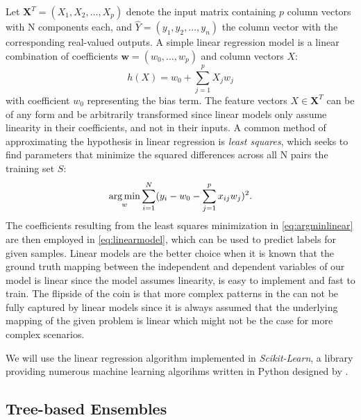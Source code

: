 Let $ \textbf{X}^{T} = (X_1, X_2, \dots, X_p) $ denote the input matrix containing $ p $ column vectors with N components each, and $ \hat{Y} = (y_1, y_2, \dots, y_n)$ the column vector with the corresponding real-valued outputs. A simple linear regression model is a linear combination of coefficients $ \mathbf{w} = (w_0, \dots, w_p) $ and column vectors $ X $:
\begin{equation}\label{eq:linearmodel}
h(X) = w_0 + \sum_{j=1}^{p} X_jw_j
\end{equation}
with coefficient $ w_0 $ representing the bias term. The feature vectors $ X \in \textbf{X}^{T} $ can be of any form and be arbitrarily transformed since linear models only assume linearity in their coefficients, and not in their inputs.
A common method of approximating the hypothesis in linear regression is \textit{least squares}, which seeks to find parameters that minimize the squared differences across all N pairs the training set $ S $:
\begin{equation}\label{eq:argminlinear}
\operatorname*{arg\,min}_{w} \sum_{i=1}^{N}(y_i - w_0 - \sum_{j=1}^{p} x_{ij}w_j)^2. 
\end{equation}
The coefficients resulting from the least squares minimization in \ref{eq:argminlinear} are then employed in \ref{eq:linearmodel}, which can be used to predict labels for given samples. 
Linear models are the better choice when it is known that the ground truth mapping between the independent and dependent variables of our model is linear since the model assumes linearity, is easy to implement and fast to train. The flipside of the coin is that more complex patterns in the can not be fully captured by linear models since it is always assumed that the underlying mapping of the given problem is linear which might not be the case for more complex scenarios. 

We will use the linear regression algorithm implemented in \textit{Scikit-Learn}, a library providing numerous machine learning algorihms written in Python designed by \cite{scikit-learn}.

\subsection{Tree-based Ensembles}

